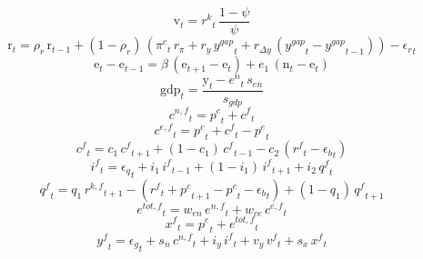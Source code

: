 \begin{dmath}
{{\mathrm{v}}}_{t}={{r^{k}}}_{t}\, \frac{1-{{\psi}}}{{{\psi}}}
\end{dmath}
\begin{dmath}
{{\mathrm{r}}}_{t}={{\rho_{r}}}\, {{\mathrm{r}}}_{t-1}+\left(1-{{\rho_{r}}}\right)\, \left({{\pi^{c}}}_{t}\, {{r_{\pi}}}+{{r_{y}}}\, {{y^{gap}}}_{t}+{{r_{\Delta y}}}\, \left({{y^{gap}}}_{t}-{{y^{gap}}}_{t-1}\right)\right)-{{\epsilon_{r}}}_{t}
\end{dmath}
\begin{dmath}
{{\mathrm{e}}}_{t}-{{\mathrm{e}}}_{t-1}={{\beta}}\, \left({{\mathrm{e}}}_{t+1}-{{\mathrm{e}}}_{t}\right)+{{e_{1}}}\, \left({{\mathrm{n}}}_{t}-{{\mathrm{e}}}_{t}\right)
\end{dmath}
\begin{dmath}
{{\mathrm{gdp}}}_{t}=\frac{{{\mathrm{y}}}_{t}-{{e^{n}}}_{t}\, {{s_{en}}}}{{{s_{gdp}}}}
\end{dmath}
\begin{dmath}
{{c^{n,f}}}_{t}={{p^{c}}}_{t}+{{c^{f}}}_{t}
\end{dmath}
\begin{dmath}
{{c^{e,f}}}_{t}={{p^{c}}}_{t}+{{c^{f}}}_{t}-{{p^{e}}}_{t}
\end{dmath}
\begin{dmath}
{{c^{f}}}_{t}={{c_{1}}}\, {{c^{f}}}_{t+1}+\left(1-{{c_{1}}}\right)\, {{c^{f}}}_{t-1}-{{c_{2}}}\, \left({{r^{f}}}_{t}-{{\epsilon_{b}}}_{t}\right)
\end{dmath}
\begin{dmath}
{{i^{f}}}_{t}={{\epsilon_{q}}}_{t}+{{i_{1}}}\, {{i^{f}}}_{t-1}+\left(1-{{i_{1}}}\right)\, {{i^{f}}}_{t+1}+{{i_{2}}}\, {{q^{f}}}_{t}
\end{dmath}
\begin{dmath}
{{q^{f}}}_{t}={{q_{1}}}\, {{r^{k,f}}}_{t+1}-\left({{r^{f}}}_{t}+{{p^{c}}}_{t+1}-{{p^{c}}}_{t}-{{\epsilon_{b}}}_{t}\right)+\left(1-{{q_{1}}}\right)\, {{q^{f}}}_{t+1}
\end{dmath}
\begin{dmath}
{{e^{tot,f}}}_{t}={{w_{en}}}\, {{e^{n,f}}}_{t}+{{w_{ce}}}\, {{c^{e,f}}}_{t}
\end{dmath}
\begin{dmath}
{{x^{f}}}_{t}={{p^{e}}}_{t}+{{e^{tot,f}}}_{t}
\end{dmath}
\begin{dmath}
{{y^{f}}}_{t}={{\epsilon_{g}}}_{t}+{{s_{n}}}\, {{c^{n,f}}}_{t}+{{i_{y}}}\, {{i^{f}}}_{t}+{{v_{y}}}\, {{v^{f}}}_{t}+{{s_{x}}}\, {{x^{f}}}_{t}
\end{dmath}
